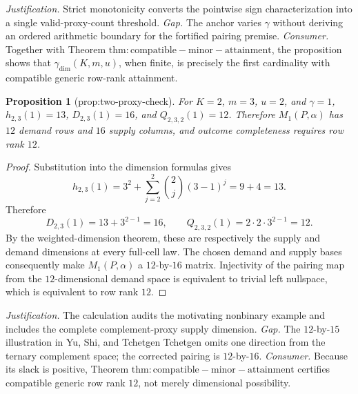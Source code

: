 \documentclass{article}
\newtheorem{proposition}{Proposition}
\begin{document}
\par\smallskip\noindent \textit{Justification.} Strict monotonicity converts the pointwise sign characterization into a single valid-proxy-count threshold. \textit{Gap.} The anchor varies \(\gamma\) without deriving an ordered arithmetic boundary for the fortified pairing premise. \textit{Consumer.} Together with Theorem \(\mathrm{thm:compatible-minor-attainment}\), the proposition shows that \(\gamma_{\mathrm{dim}}(K,m,u)\), when finite, is precisely the first cardinality with compatible generic row-rank attainment.

\begin{proposition}[prop:two-proxy-check]\label{prop:two-proxy-check}
For \(K=2\), \(m=3\), \(u=2\), and \(\gamma=1\), \(h_{2,3}(1)=13\), \(D_{2,3}(1)=16\), and \(Q_{2,3,2}(1)=12\). Therefore \(M_1(P,\alpha)\) has \(12\) demand rows and \(16\) supply columns, and outcome completeness requires row rank \(12\).
\end{proposition}
\begin{proof}
Substitution into the dimension formulas gives
\[h_{2,3}(1)=3^2+\sum_{j=2}^2\binom2j(3-1)^j=9+4=13.\]
Therefore
\[D_{2,3}(1)=13+3^{2-1}=16,\qquad Q_{2,3,2}(1)=2\cdot2\cdot3^{2-1}=12.\]
By the weighted-dimension theorem, these are respectively the supply and demand dimensions at every full-cell law. The chosen demand and supply bases consequently make \(M_1(P,\alpha)\) a \(12\)-by-\(16\) matrix. Injectivity of the pairing map from the \(12\)-dimensional demand space is equivalent to trivial left nullspace, which is equivalent to row rank \(12\).
\end{proof}
\par\smallskip\noindent \textit{Justification.} The calculation audits the motivating nonbinary example and includes the complete complement-proxy supply dimension. \textit{Gap.} The \(12\)-by-\(15\) illustration in Yu, Shi, and Tchetgen Tchetgen \cite{YuShiTchetgen2025} omits one direction from the ternary complement space; the corrected pairing is \(12\)-by-\(16\). \textit{Consumer.} Because its slack is positive, Theorem \(\mathrm{thm:compatible-minor-attainment}\) certifies compatible generic row rank \(12\), not merely dimensional possibility.
\end{document}
